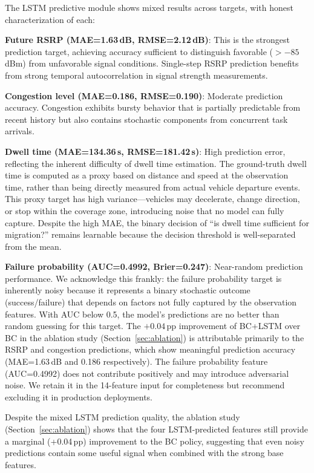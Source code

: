 \documentclass[journal,twoside]{IEEEtran}
\begin{document}
The LSTM predictive module shows mixed results across targets, with honest characterization of each:

\textbf{Future RSRP (MAE=1.63\,dB, RMSE=2.12\,dB)}: This is the strongest prediction target, achieving accuracy sufficient to distinguish favorable ($>-85$\,dBm) from unfavorable signal conditions. Single-step RSRP prediction benefits from strong temporal autocorrelation in signal strength measurements.

\textbf{Congestion level (MAE=0.186, RMSE=0.190)}: Moderate prediction accuracy. Congestion exhibits bursty behavior that is partially predictable from recent history but also contains stochastic components from concurrent task arrivals.

\textbf{Dwell time (MAE=134.36\,s, RMSE=181.42\,s)}: High prediction error, reflecting the inherent difficulty of dwell time estimation. The ground-truth dwell time is computed as a proxy based on distance and speed at the observation time, rather than being directly measured from actual vehicle departure events. This proxy target has high variance---vehicles may decelerate, change direction, or stop within the coverage zone, introducing noise that no model can fully capture. Despite the high MAE, the binary decision of ``is dwell time sufficient for migration?'' remains learnable because the decision threshold is well-separated from the mean.

\textbf{Failure probability (AUC=0.4992, Brier=0.247)}: Near-random prediction performance. We acknowledge this frankly: the failure probability target is inherently noisy because it represents a binary stochastic outcome (success/failure) that depends on factors not fully captured by the observation features. With AUC below 0.5, the model's predictions are no better than random guessing for this target. The $+0.04$\,pp improvement of BC+LSTM over BC in the ablation study (Section~\ref{sec:ablation}) is attributable primarily to the RSRP and congestion predictions, which show meaningful prediction accuracy (MAE=1.63\,dB and 0.186 respectively). The failure probability feature (AUC=0.4992) does not contribute positively and may introduce adversarial noise. We retain it in the 14-feature input for completeness but recommend excluding it in production deployments.

Despite the mixed LSTM prediction quality, the ablation study (Section~\ref{sec:ablation}) shows that the four LSTM-predicted features still provide a marginal (+0.04\,pp) improvement to the BC policy, suggesting that even noisy predictions contain some useful signal when combined with the strong base features.
\end{document}

